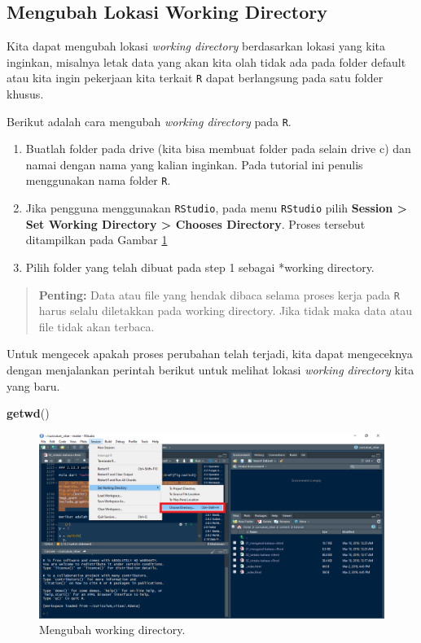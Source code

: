 \documentclass[]{book}
\newenvironment{Shaded}{\begin{snugshade}}{\end{snugshade}}
\newcommand{\KeywordTok}[1]{\textcolor[rgb]{0.13,0.29,0.53}{\textbf{#1}}}
\newcommand{\NormalTok}[1]{#1}
\providecommand{\tightlist}{%
  \setlength{\itemsep}{0pt}\setlength{\parskip}{0pt}}
\theoremstyle{definition}
\theoremstyle{definition}
\theoremstyle{definition}
\theoremstyle{remark}
\begin{document}
\hypertarget{changewdR}{%
\subsection{Mengubah Lokasi Working Directory}\label{changewdR}}

Kita dapat mengubah lokasi \emph{working directory} berdasarkan lokasi yang kita inginkan, misalnya letak data yang akan kita olah tidak ada pada folder default atau kita ingin pekerjaan kita terkait \texttt{R} dapat berlangsung pada satu folder khusus.

Berikut adalah cara mengubah \emph{working directory} pada \texttt{R}.

\begin{enumerate}
\def\labelenumi{\arabic{enumi}.}
\tightlist
\item
  Buatlah folder pada drive (kita bisa membuat folder pada selain drive c) dan namai dengan nama yang kalian inginkan. Pada tutorial ini penulis menggunakan nama folder \texttt{R}.
\item
  Jika pengguna menggunakan \texttt{RStudio}, pada menu \texttt{RStudio} pilih \textbf{Session \textgreater{} Set Working Directory \textgreater{} Chooses Directory}. Proses tersebut ditampilkan pada Gambar \ref{fig:working}
\item
  Pilih folder yang telah dibuat pada step 1 sebagai *working directory.
\end{enumerate}

\begin{quote}
\textbf{Penting:} Data atau file yang hendak dibaca selama proses kerja pada \texttt{R} harus selalu diletakkan pada working directory. Jika tidak maka data atau file tidak akan terbaca.
\end{quote}

Untuk mengecek apakah proses perubahan telah terjadi, kita dapat mengeceknya dengan menjalankan perintah berikut untuk melihat lokasi \emph{working directory} kita yang baru.

\begin{Shaded}
\begin{Highlighting}[]
\KeywordTok{getwd}\NormalTok{()}
\end{Highlighting}
\end{Shaded}

\begin{figure}

{\centering \includegraphics[width=0.8\linewidth]{./images/working} 

}

\caption{Mengubah working directory.}\label{fig:working}
\end{figure}
\end{document}
